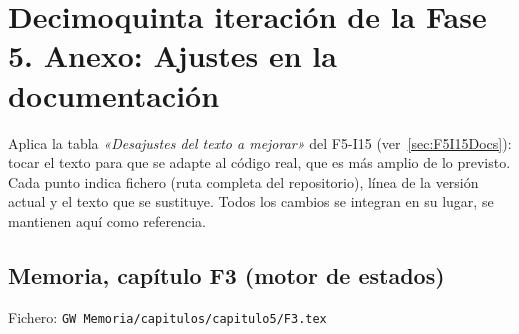 \section{Decimoquinta iteración de la Fase 5. Anexo: Ajustes en la documentación}
\label{sec:F5I15a}

Aplica la tabla \emph{«Desajustes del texto a mejorar»} del F5-I15
(ver~\ref{sec:F5I15Docs}): tocar el texto para que se adapte al código
real, que es más amplio de lo previsto. Cada punto indica fichero
(ruta completa del repositorio), línea de la versión actual y el texto
que se sustituye. Todos los cambios se integran en su lugar, se mantienen aquí como referencia.


\subsection{Memoria, capítulo F3 (motor de estados)}
\label{sec:F5I16F3}

Fichero: \texttt{GW Memoria/capitulos/capitulo5/F3.tex}


